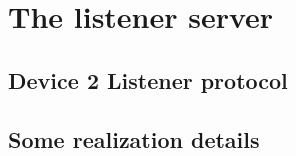 
\section{The listener server}
\label{listener}

\subsection{Device 2 Listener protocol}

\subsection{Some realization details}

